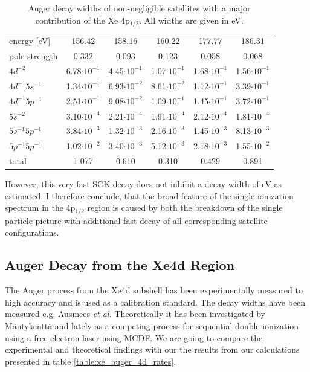 \begin{table}[h]
 \centering
 \caption{Auger decay widths of non-negligible satellites with a major
          contribution of the Xe 4p$_{1/2}$. All widths are given in \unit{eV}.}
 \begin{tabular}{lccccc}
   \toprule
   energy [\unit{eV}] & 156.42  & 158.16 & 160.22 & 177.77 & 186.31\\
   pole strength       &   0.332 &   0.093&   0.123&   0.058&   0.068\\
   \midrule
   $4d^{-2}$          & 6.78$\cdot10^{-1}$ & 4.45$\cdot10^{-1}$ & 1.07$\cdot10^{-1}$ & 1.68$\cdot10^{-1}$ & 1.56$\cdot10^{-1}$\\
   $4d^{-1}5s^{-1}$   & 1.34$\cdot10^{-1}$ & 6.93$\cdot10^{-2}$ & 8.61$\cdot10^{-2}$ & 1.12$\cdot10^{-1}$ & 3.39$\cdot10^{-1}$\\
   $4d^{-1}5p^{-1}$   & 2.51$\cdot10^{-1}$ & 9.08$\cdot10^{-2}$ & 1.09$\cdot10^{-1}$ & 1.45$\cdot10^{-1}$ & 3.72$\cdot10^{-1}$\\
   $5s^{-2}$          & 3.10$\cdot10^{-4}$ & 2.21$\cdot10^{-4}$ & 1.91$\cdot10^{-4}$ & 2.12$\cdot10^{-4}$ & 1.81$\cdot10^{-4}$\\
   $5s^{-1}5p^{-1}$   & 3.84$\cdot10^{-3}$ & 1.32$\cdot10^{-3}$ & 2.16$\cdot10^{-3}$ & 1.45$\cdot10^{-3}$ & 8.13$\cdot10^{-3}$\\
   $5p^{-1}5p^{-1}$   & 1.02$\cdot10^{-2}$ & 3.40$\cdot10^{-3}$ & 5.12$\cdot10^{-3}$ & 2.18$\cdot10^{-3}$ & 1.55$\cdot10^{-2}$\\
   \midrule
   total              &   1.077 &   0.610&   0.310&   0.429&   0.891\\
   \bottomrule
 \end{tabular}
 \label{table:xe_auger_rel11}
\end{table}

However, this very fast \ac{SCK} decay does not inhibit a decay width of
\unit[10--100]{eV} as estimated\cite{}. I therefore conclude, that the broad
feature of the single ionization spectrum in the 4p$_{1/2}$ region is caused
by both the breakdown of the single particle picture with additional fast decay
of all corresponding satellite configurations.


\subsection{Auger Decay from the Xe4d Region}

The Auger process from the Xe4d subshell has been experimentally
measured to high accuracy and is used as a calibration standard. \cite{Carroll02}
The decay widths have been measured e.g. Ausmees \textit{et al.}
\cite{Ausmees99,Aksela94}
Theoretically it has been investigated  by Mäntykenttä \cite{Maentykenttae93}
and lately as a competing process for
sequential double ionization using a free electron laser \cite{Fritzsche11}
using \ac{MCDF}. 
We are going to compare the experimental and theoretical findings with our 
the results from our calculations presented in table \ref{table:xe_auger_4d_rates}.

